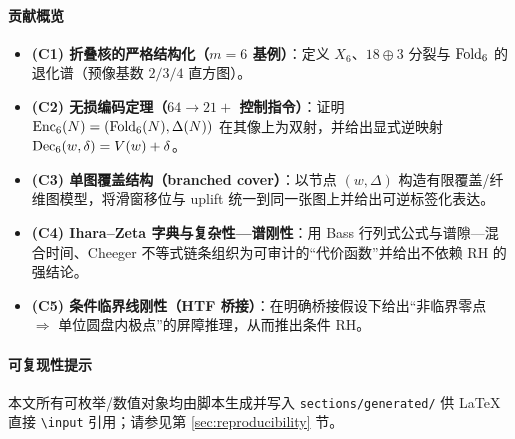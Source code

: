 \begin{abstract}
本文在一个严格分层（数学层/接口层）的离散框架中研究“有限分辨率读出—稳定型压缩—跨尺度递归—谱刚性”的统一结构。核心对象是长度 $m=6$ 的分辨率折叠核：微态空间 $\Omega_6=\{0,1\}^6$（$\abs{\Omega_6}=64$）经黄金均值语法约束得到稳定型集合 $X_6\subset\{0,1\}^6$（$\abs{X_6}=21$），并存在可计算满射 $\Fold_6:\{0,\dots,63\}\twoheadrightarrow X_6$ 及严格的 $18\oplus 3$ 环闭/边界分裂。我们给出“$(64\to 21)$ + 控制指令”的无损编码定理：用 $(w,\Delta)$（稳定码字与 uplift）实现对 $64$ 微态的一一复原，并据此构造“单图结构”的带标签覆盖图，将滑窗移位、uplift 与控制指令统一到同一张有限图上，作为跨尺度折叠与可验证计算的基本载体。进一步地，我们建立 Ihara--Zeta 的确定性“谱—闭环”字典，将扩展性、谱隙与混合时间的硬不等式链条写成可审计的复杂性—谱刚性结论；在一条明确桥接假设（HTF，阿贝尔正则的迹公式嵌入）下证明临界线刚性：任何 $\Re(\rho)\neq \tfrac12$ 的零点将诱导 $\abs{r}<1$ 的内部极点，从而与几何侧的单位圆盘全纯性相矛盾。全文配套给出可复现实验/脚本接口与后续可证工作包。
\end{abstract}

\paragraph{贡献概览}
\begin{itemize}
  \item \textbf{(C1) 折叠核的严格结构化（$m=6$ 基例）}：定义 $X_6$、$18\oplus 3$ 分裂与 $\mathrm{Fold}_6$ 的退化谱（预像基数 $2/3/4$ 直方图）。
  \item \textbf{(C2) 无损编码定理（$64\to 21+$ 控制指令）}：证明 $\mathrm{Enc}_6(N)=(\mathrm{Fold}_6(N),\Delta(N))$ 在其像上为双射，并给出显式逆映射 $\mathrm{Dec}_6(w,\delta)=V(w)+\delta$。
  \item \textbf{(C3) 单图覆盖结构（branched cover）}：以节点 $(w,\Delta)$ 构造有限覆盖/纤维图模型，将滑窗移位与 uplift 统一到同一张图上并给出可逆标签化表达。
  \item \textbf{(C4) Ihara--Zeta 字典与复杂性—谱刚性}：用 Bass 行列式公式与谱隙—混合时间、Cheeger 不等式链条组织为可审计的“代价函数”并给出不依赖 RH 的强结论。
  \item \textbf{(C5) 条件临界线刚性（HTF 桥接）}：在明确桥接假设下给出“非临界零点 $\Rightarrow$ 单位圆盘内极点”的屏障推理，从而推出条件 RH。
\end{itemize}

\paragraph{可复现性提示}
本文所有可枚举/数值对象均由脚本生成并写入 \texttt{sections/generated/} 供 \LaTeX{} 直接 \texttt{\textbackslash input} 引用；请参见第 \ref{sec:reproducibility} 节。

